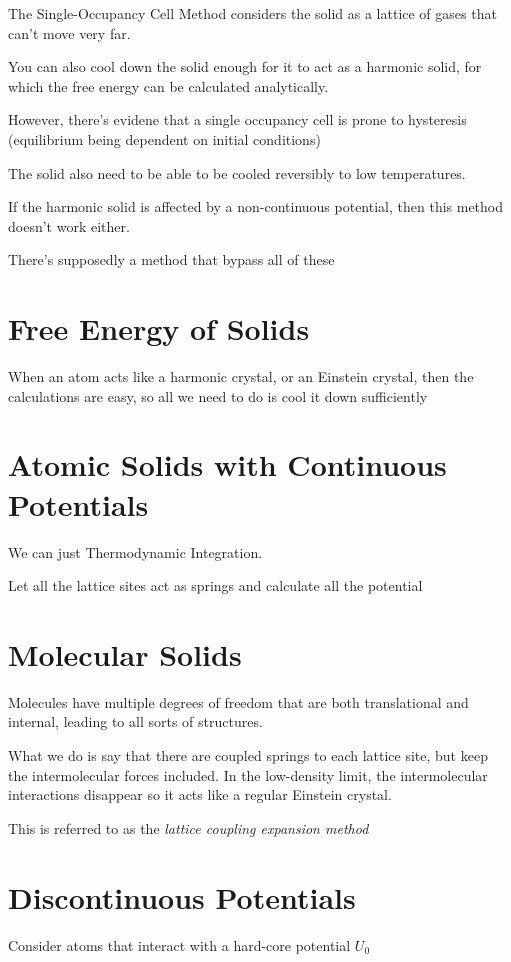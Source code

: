 \documentclass[fleqn]{report}
\begin{document}
The Single-Occupancy Cell Method considers the solid as a lattice of 
gases that can't move very far. 

You can also cool down the solid enough for it to act as a harmonic solid, for 
which the free energy can be calculated analytically. 

However, there's evidene that a single occupancy cell is prone to 
hysteresis (equilibrium being dependent on initial conditions)

The solid also need to be able to be cooled reversibly to low temperatures.

If the harmonic solid is affected by a non-continuous potential, then 
this method doesn't work either. 

There's supposedly a method that bypass all of these 

\section{Free Energy of Solids}
When an atom acts like a harmonic crystal, or an Einstein crystal, then 
the calculations are easy, so all we need to do is cool it down sufficiently 

\section{Atomic Solids with Continuous Potentials}
We can just Thermodynamic Integration. 

Let all the lattice sites act as springs and calculate all the potential 

\section{Molecular Solids}
Molecules have multiple degrees of freedom that are both translational and 
internal, leading to all sorts of structures. 

What we do is say that there are coupled springs to each 
lattice site, but keep the intermolecular forces included. In the low-density 
limit, the intermolecular interactions disappear so it acts like a 
regular Einstein crystal. 

This is referred to as the \textit{lattice coupling expansion method}

\section{Discontinuous Potentials}
Consider atoms that interact with a hard-core potential $U_0$ 
\end{document}
